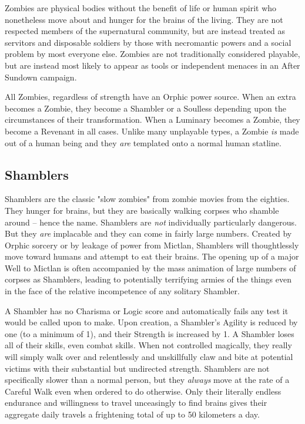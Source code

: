Zombies are physical bodies without the benefit of life or human spirit who nonetheless move about and hunger for the brains of the living. They are not respected members of the supernatural community, but are instead treated as servitors and disposable soldiers by those with necromantic powers and a social problem by most everyone else. Zombies are not traditionally considered playable, but are instead most likely to appear as tools or independent menaces in an After Sundown campaign.

All Zombies, regardless of strength have an Orphic power source. When an extra becomes a Zombie, they become a Shambler or a Soulless depending upon the circumstances of their transformation. When a Luminary becomes a Zombie, they become a Revenant in all cases. Unlike many unplayable types, a Zombie \textit{is} made out of a human being and they \textit{are} templated onto a normal human statline.

\subsection{Shamblers} 

Shamblers are the classic "slow zombies" from zombie movies from the eighties. They hunger for brains, but they are basically walking corpses who shamble around -- hence the name. Shamblers are \textit{not} individually particularly dangerous. But they \textit{are} implacable and they can come in fairly large numbers. Created by Orphic sorcery or by leakage of power from Mictlan, Shamblers will thoughtlessly move toward humans and attempt to eat their brains. The opening up of a major Well to Mictlan is often accompanied by the mass animation of large numbers of corpses as Shamblers, leading to potentially terrifying armies of the things even in the face of the relative incompetence of any solitary Shambler.

A Shambler has no Charisma or Logic score and automatically fails any test it would be called upon to make. Upon creation, a Shambler's Agility is reduced by one (to a minimum of 1), and their Strength is increased by 1. A Shambler loses all of their skills, even combat skills. When not controlled magically, they really will simply walk over and relentlessly and unskillfully claw and bite at potential victims with their substantial but undirected strength. Shamblers are not specifically slower than a normal person, but they \textit{always} move at the rate of a Careful Walk even when ordered to do otherwise. Only their literally endless endurance and willingness to travel unceasingly to find brains gives their aggregate daily travels a frightening total of up to 50 kilometers a day. 

